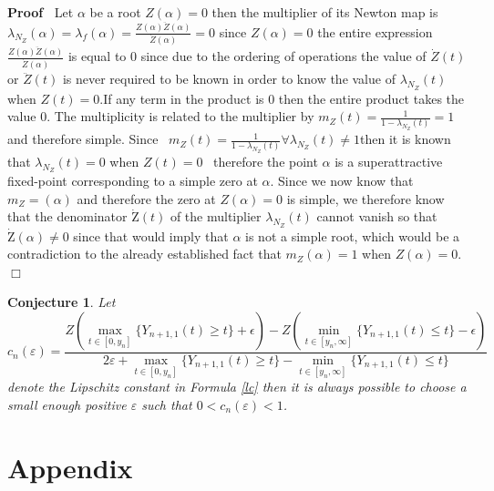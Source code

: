 \documentclass{article}
\newcommand{\Zeta}{\mathrm{Z}}
\newenvironment{proof}{\noindent\textbf{Proof\ }}{\hspace*{\fill}$\Box$\medskip}
\newtheorem{conjecture}{Conjecture}
\begin{document}
\begin{proof}
  Let $\alpha$ be a root $Z (\alpha) = 0$ then the multiplier of its Newton
  map is $\lambda_{N_Z} (\alpha) = \lambda_f (\alpha) = \frac{Z (\alpha)
  \ddot{Z} (\alpha)}{\dot{Z} (\alpha)} = 0$ since $Z (\alpha) = 0$ the entire
  expression $\frac{Z (\alpha) \ddot{Z} (\alpha)}{\dot{Z} (\alpha)}$ is equal
  to 0 since due to the ordering of operations the value of $\dot{Z} (t)$ or
  $\ddot{Z} (t)$ is never required to be known in order to know the value of
  $\lambda_{N_Z} (t)$ when $Z (t) = 0$.\quad If any term in the product is 0
  then the entire product takes the value 0. The multiplicity is related to
  the multiplier by $m_Z (t) = \frac{1}{1 - \lambda_{N_Z} (t)} = 1$ and
  therefore simple. Since \ $m_Z (t) = \frac{1}{1 - \lambda_{N_Z} (t)} \forall
  \lambda_{N_Z} (t) \neq 1$then it is known that $\lambda_{N_Z} (t) = 0$ when
  $Z (t_{}) = 0$ \ therefore the point $\alpha$ is a superattractive
  fixed-point corresponding to a simple zero at $\alpha$. Since we now know
  that $m_Z = (\alpha)$ and therefore the zero at $Z (\alpha) = 0$ is simple,
  we therefore know that the denominator $\dot{\Zeta} (t)$ of the multiplier
  $\lambda_{N_Z} (t)$ cannot vanish so that \ \ $\dot{\Zeta} (\alpha) \neq 0$
  since that would imply that $\alpha$ is not a simple root, which would be a
  contradiction to the already established fact that $m_Z (\alpha) = 1$ when
  $Z (\alpha) = 0$.
\end{proof}

\begin{conjecture}
  Let
  \begin{equation}
    c_n (\varepsilon) = \frac{Z (\max_{t \in [0, y_n]} \{ Y_{n + 1, 1} (t)
    \geqslant t \} + \epsilon) - Z (\min_{t \in [y_n, \infty]} \{ Y_{n + 1, 1}
    (t) \leqslant t \} - \epsilon)}{2 \varepsilon + \max_{t \in [0, y_n]} \{
    Y_{n + 1, 1} (t) \geqslant t \} - \min_{t \in [y_n, \infty]} \{ Y_{n + 1,
    1} (t) \leqslant t \}}
  \end{equation}
  denote the Lipschitz constant in Formula \ref{lc} then it is always possible
  to choose a small enough positive $\varepsilon$ such that $0 < c_n
  (\varepsilon) < 1$.
\end{conjecture}

\section{Appendix}
\end{document}

